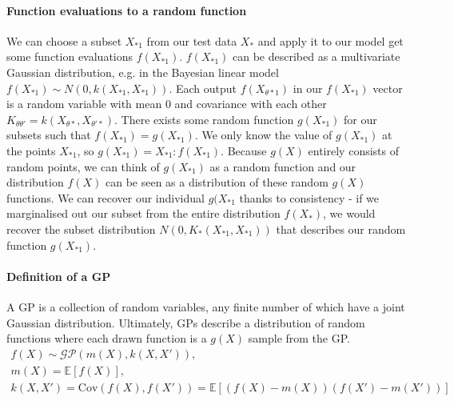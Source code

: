 \paragraph{Function evaluations to a random function}
We can choose a subset $X_{*1}$ from our test data $X_*$ and apply it to our model get some function evaluations $f(X_{*1})$. $f(X_{*1})$ can be described as a multivariate Gaussian distribution, e.g. in the Bayesian linear model $f(X_{*1}) \sim N(0, k(X_{*1}, X_{*1}))$. Each output $f(X_{\theta*1})$ in our $f(X_{*1})$ vector is a random variable with mean $0$ and covariance with each other $K_{\theta\theta'} = k(X_{\theta*}, X_{\theta'*})$. There exists some random function $g(X_{*1})$ for our subsets such that $f(X_{*1}) = g(X_{*1})$. We only know the value of $g(X_{*1})$ at the points $X_{*1}$, so $g(X_{*1}) = {X_{*1} : f(X_{*1})}$. Because $g(X)$ entirely consists of random points, we can think of $g(X_{*1})$ as a random function and our distribution $f(X)$ can be seen as a distribution of these random $g(X)$ functions. We can recover our individual $g(X_{*1}$ thanks to consistency - if we marginalised out our subset from the entire distribution $f(X_*)$, we would recover the subset distribution $N(0, K_*(X_{*1}, X_{*1}))$ that describes our random function $g(X_{*1})$.

\paragraph{Definition of a GP}
A GP is a collection of random variables, any finite number of which have a joint Gaussian distribution. Ultimately, GPs describe a distribution of random functions where each drawn function is a $g(X)$ sample from the GP.
\begin{equation*}
    \begin{aligned}
        f(X) \sim \mathcal{GP}(m(X), k(X,X')), \\
        m(X) = \mathbb{E}[f(X)], \\
        k(X,X') = \text{Cov}(f(X), f(X')) = \mathbb{E}[(f(X) - m(X))(f(X') - m(X'))]
    \end{aligned}
\end{equation*}

